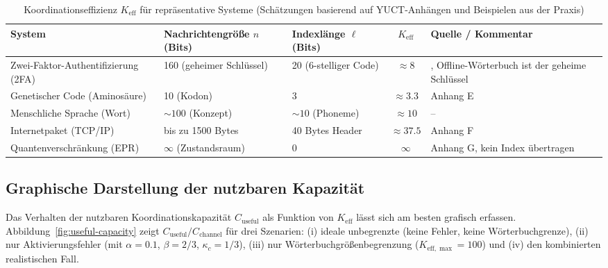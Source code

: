 \documentclass[12pt,a4paper]{article}
\theoremstyle{remark}
\newcommand{\Keff}{K_{\mathrm{eff}}}
\newcommand{\Keffmax}{K_{\mathrm{eff},\max}}
\begin{document}
	\begin{table}[htbp]
		\centering
		\caption{Koordinationseffizienz $\Keff$ für repräsentative Systeme (Schätzungen basierend auf YUCT-Anhängen und Beispielen aus der Praxis)}
		\label{tab:keff-examples}
		\footnotesize
		\begin{tabularx}{\textwidth}{XXXcX}
			\toprule
			System & Nachrichtengröße $n$ (Bits) & Indexlänge $\ell$ (Bits) & $\Keff$ & Quelle / Kommentar \\
			\midrule
			Zwei-Faktor-Authentifizierung (2FA) & 160 (geheimer Schlüssel) & 20 (6-stelliger Code) & $\approx 8$ & \cite{Yakushev2026b}, Offline-Wörterbuch ist der geheime Schlüssel \\
			Genetischer Code (Aminosäure) & 10 (Kodon) & 3 & $\approx 3.3$ & Anhang E \\
			Menschliche Sprache (Wort) & $\sim 100$ (Konzept) & $\sim 10$ (Phoneme) & $\approx 10$ & – \\
			Internetpaket (TCP/IP) & bis zu 1500 Bytes & 40 Bytes Header & $\approx 37.5$ & Anhang F \\
			Quantenverschränkung (EPR) & $\infty$ (Zustandsraum) & 0 & $\infty$ & Anhang G, kein Index übertragen \\
			\bottomrule
		\end{tabularx}
	\end{table}
	
	\subsection{Graphische Darstellung der nutzbaren Kapazität}
	\label{sec:graphical}
	
	Das Verhalten der nutzbaren Koordinationskapazität $C_{\text{useful}}$ als Funktion von $\Keff$ lässt sich am besten grafisch erfassen. Abbildung~\ref{fig:useful-capacity} zeigt $C_{\text{useful}}/C_{\text{channel}}$ für drei Szenarien: (i) ideale unbegrenzte (keine Fehler, keine Wörterbuchgrenze), (ii) nur Aktivierungsfehler (mit $\alpha=0.1$, $\beta=2/3$, $\kappa_c=1/3$), (iii) nur Wörterbuchgrößenbegrenzung ($\Keffmax=100$) und (iv) den kombinierten realistischen Fall.
	
\end{document}
